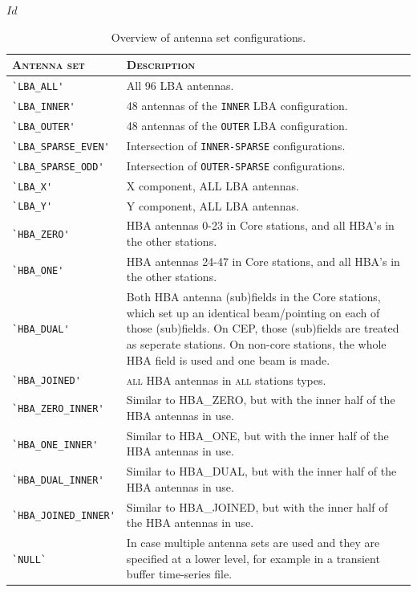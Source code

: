 \svnInfo $Id$





\begin{table}[ht]
  \centering
  \begin{tabular}{|lp{10cm}|}
    \hline
    \textsc{Antenna set} & \textsc{Description} \\
    \hline \hline
    \verb|`LBA_ALL'| &  All 96 LBA antennas.\\
    \verb|`LBA_INNER'| &  48 antennas of the \verb|INNER| LBA configuration.\\
    \verb|`LBA_OUTER'|  & 48 antennas of the \verb|OUTER|  LBA configuration.\\
    \verb|`LBA_SPARSE_EVEN'| & Intersection of \verb|INNER-SPARSE| configurations. \\
    \verb|`LBA_SPARSE_ODD'|  &  Intersection of \verb|OUTER-SPARSE| configurations. \\
    \verb|`LBA_X'| &   X component, ALL LBA antennas. \\
    \verb|`LBA_Y'| &   Y component, ALL LBA antennas.\\
    \verb|`HBA_ZERO'| &  HBA antennas 0-23 in Core stations, and all HBA's in the other stations. \\
    \verb|`HBA_ONE'|   & HBA antennas 24-47 in Core stations, and all HBA's in the other stations. \\
    \verb|`HBA_DUAL'| & Both HBA antenna (sub)fields in the Core stations, which set up an identical
    beam/pointing on each of those (sub)fields. On CEP, those (sub)fields are treated as seperate stations. On non-core
    stations, the whole HBA field is used and one beam is made. \\
    \verb|`HBA_JOINED'| & \textsc{all} HBA antennas in \textsc{all} stations types. \\
    \verb|`HBA_ZERO_INNER'| & Similar to HBA\_ZERO, but with the inner half of the HBA antennas in use. \\
    \verb|`HBA_ONE_INNER'| & Similar to HBA\_ONE, but with the inner half of the HBA antennas in use.  \\
    \verb|`HBA_DUAL_INNER'| & Similar to HBA\_DUAL, but with the inner half of the HBA antennas in use.  \\
    \verb|`HBA_JOINED_INNER'| & Similar to HBA\_JOINED, but with the inner half of the HBA antennas in use.   \\
    \verb|`NULL`| & In case multiple antenna sets are used and they are specified at a lower level, for example in a transient buffer time-series file. \\
    \hline
  \end{tabular}
  \caption{Overview of antenna set configurations.}
  \label{tab:antenna-set}
\end{table}

